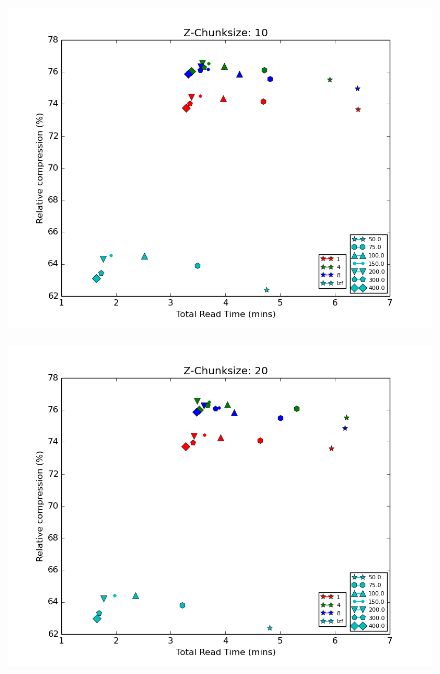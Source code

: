 \documentclass[a4paper]{article}
\begin{document}
      \begin{figure}[h!]
        \centering
        \includegraphics[scale=0.5]{Compression-ratio-vs-Read-time-z_chunk-10.png}
      \end{figure}
    
      \begin{figure}[h!]
        \centering
        \includegraphics[scale=0.5]{Compression-ratio-vs-Read-time-z_chunk-20.png}
      \end{figure}
    
  \newpage
\end{document}
